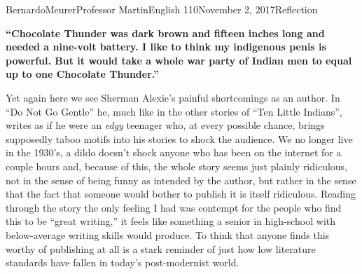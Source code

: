\documentclass[12pt,letterpaper]{article}
\begin{document}
    \begin{mla}{Bernardo}{Meurer}{Professor Martin}{English 110}{November 2, 2017}{Reflection}
    \begin{singlespace}
        \textbf{``Chocolate Thunder was dark brown and fifteen inches long and needed a nine-volt battery. I like to think my indigenous penis is powerful. But it would take a whole war party of Indian men to equal up to one Chocolate Thunder.''}
    \end{singlespace}
    
    Yet again here we see Sherman Alexie's painful shortcomings as an author. In ``Do Not Go Gentle'' he, much like in the other stories of ``Ten Little Indians'', writes as if he were an \emph{edgy} teenager who, at every possible chance, brings supposedly taboo motifs into his stories to shock the audience. We no longer live in the 1930's, a dildo doesn't shock anyone who has been on the internet for a couple hours and, because of this, the whole story seems just plainly ridiculous, not in the sense of being funny as intended by the author, but rather in the sense that the fact that someone would bother to publish it is itself ridiculous. Reading through the story the only feeling I had was contempt for the people who find this to be ``great writing,'' it feels like something a senior in high-school with below-average writing skills would produce. To think that anyone finds this worthy of publishing at all is a stark reminder of just how low literature standards have fallen in today's post-modernist world.
    
    \end{mla}
    
\end{document}
